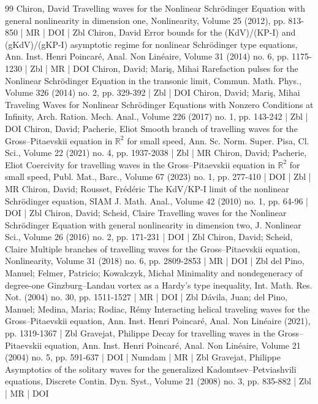 \begin{thebibliography}{99}
Chiron, David Travelling waves for the Nonlinear Schrödinger Equation with general nonlinearity in dimension one, Nonlinearity, Volume 25 (2012), pp. 813-850 | MR | DOI | Zbl
Chiron, David Error bounds for the (KdV)/(KP-I) and (gKdV)/(gKP-I) asymptotic regime for nonlinear Schrödinger type equations, Ann. Inst. Henri Poincaré, Anal. Non Linéaire, Volume 31 (2014) no. 6, pp. 1175-1230 | Zbl | MR | DOI
Chiron, David; Mariş, Mihai Rarefaction pulses for the Nonlinear Schrödinger Equation in the transonic limit, Commun. Math. Phys., Volume 326 (2014) no. 2, pp. 329-392 | Zbl | DOI
Chiron, David; Mariş, Mihai Traveling Waves for Nonlinear Schrödinger Equations with Nonzero Conditions at Infinity, Arch. Ration. Mech. Anal., Volume 226 (2017) no. 1, pp. 143-242 | Zbl | DOI
Chiron, David; Pacherie, Eliot Smooth branch of travelling waves for the Gross–Pitaevskii equation in $\mathbb{R}^2$ for small speed, Ann. Sc. Norm. Super. Pisa, Cl. Sci., Volume 22 (2021) no. 4, pp. 1937-2038 | Zbl | MR
Chiron, David; Pacherie, Eliot Coercivity for travelling waves in the Gross–Pitaevskii equation in $\mathbb{R}^2$ for small speed, Publ. Mat., Barc., Volume 67 (2023) no. 1, pp. 277-410 | DOI | Zbl | MR
Chiron, David; Rousset, Frédéric The KdV/KP-I limit of the nonlinear Schrödinger equation, SIAM J. Math. Anal., Volume 42 (2010) no. 1, pp. 64-96 | DOI | Zbl
Chiron, David; Scheid, Claire Travelling waves for the Nonlinear Schrödinger Equation with general nonlinearity in dimension two, J. Nonlinear Sci., Volume 26 (2016) no. 2, pp. 171-231 | DOI | Zbl
Chiron, David; Scheid, Claire Multiple branches of travelling waves for the Gross–Pitaevskii equation, Nonlinearity, Volume 31 (2018) no. 6, pp. 2809-2853 | MR | DOI | Zbl
del Pino, Manuel; Felmer, Patricio; Kowalczyk, Michał Minimality and nondegeneracy of degree-one Ginzburg–Landau vortex as a Hardy’s type inequality, Int. Math. Res. Not. (2004) no. 30, pp. 1511-1527 | MR | DOI | Zbl
Dávila, Juan; del Pino, Manuel; Medina, Maria; Rodiac, Rémy Interacting helical traveling waves for the Gross–Pitaevskii equation, Ann. Inst. Henri Poincaré, Anal. Non Linéaire (2021), pp. 1319-1367 | Zbl
Gravejat, Philippe Decay for travelling waves in the Gross–Pitaevskii equation, Ann. Inst. Henri Poincaré, Anal. Non Linéaire, Volume 21 (2004) no. 5, pp. 591-637 | DOI | Numdam | MR | Zbl
Gravejat, Philippe Asymptotics of the solitary waves for the generalized Kadomtsev–Petviashvili equations, Discrete Contin. Dyn. Syst., Volume 21 (2008) no. 3, pp. 835-882 | Zbl | MR | DOI

\end{thebibliography}
